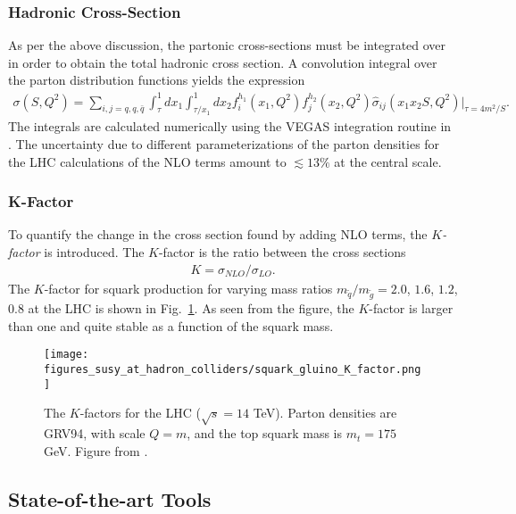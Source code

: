 \documentclass[twoside,english]{uiofysmaster}
\begin{document}
\subsubsection{Hadronic Cross-Section}

As per the above discussion, the partonic cross-sections must be integrated over in order to obtain the total hadronic cross section. A convolution integral over the parton distribution functions yields the expression 
\begin{align}
\sigma(S, Q^2) = \sum_{i,j=q, q, \bar{q}} \int_{\tau}^1dx_1 \int_{\tau/x_1}^1 dx_2 f_i^{h_1} (x_1, Q^2) f_j^{h_2}(x_2, Q^2) \hat{\sigma}_{ij} (x_1x_2S, Q^2)\Big|_{\tau=4m^2/S}.
\end{align}
The integrals are calculated numerically using the VEGAS integration routine \cite{PETERLEPAGE1978192} in \cite{beenakker1997squark}.
The uncertainty due to different parameterizations of the parton densities for the LHC calculations of the NLO terms amount to $\lesssim 13 \%$ at the central scale.

\subsubsection{K-Factor}

To quantify the change in the cross section found by adding NLO terms, the \textit{$K$-factor} is introduced. The $K$-factor is the ratio between the cross sections
\begin{align}
K = \sigma_{NLO}/\sigma_{LO}.
\end{align}
The $K$-factor for squark production for varying mass ratios $m_{\tilde{q}}/m_{\tilde{g}}=2.0$, $ 1.6$, $1.2$, $0.8$ at the LHC is shown in Fig.\ \ref{Fig:: susy hadron : K-factor LHC}. As seen from the figure, the $K$-factor is larger than one and quite stable as a function of the squark mass. 

\begin{figure}
\centering
\texttt{[image: figures\_susy\_at\_hadron\_colliders/squark\_gluino\_K\_factor.png]}
\caption{The $K$-factors for the LHC ($\sqrt{s}=14$ TeV). Parton densities are GRV94, with scale $Q=m$, and the top squark mass is $m_t=175$ GeV. Figure from \cite{beenakker1997squark}.}
\label{Fig:: susy hadron : K-factor LHC}
\end{figure}


\subsection{State-of-the-art Tools}
\end{document}
